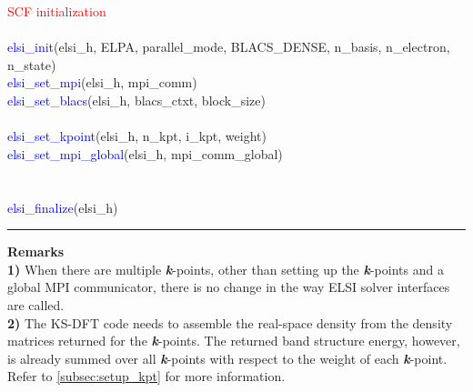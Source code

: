 \documentclass{report}
\begin{document}
\begin{algorithm}[H]
\textcolor{red}{SCF initialization}\\
\hspace{0.3cm}\\
\textcolor{blue}{elsi\_init}(elsi\_h, ELPA, parallel\_mode, BLACS\_DENSE, n\_basis, n\_electron, n\_state)\\
\textcolor{blue}{elsi\_set\_mpi}(elsi\_h, mpi\_comm)\\
\textcolor{blue}{elsi\_set\_blacs}(elsi\_h, blacs\_ctxt, block\_size)\\
\hspace{0.3cm}\\
\textcolor{blue}{elsi\_set\_kpoint}(elsi\_h, n\_kpt, i\_kpt, weight)\\
\textcolor{blue}{elsi\_set\_mpi\_global}(elsi\_h, mpi\_comm\_global)\\
\hspace{0.3cm}\\
\hspace{0.3cm}\\
\textcolor{blue}{elsi\_finalize}(elsi\_h)\\
\end{algorithm}

\bigskip
\noindent\rule{18cm}{0.4pt}

\newpage
\textbf{Remarks}\\

\textbf{1)} When there are multiple \textbf{\textit{k}}-points, other than setting up the \textbf{\textit{k}}-points and a global MPI communicator, there is no change in the way ELSI solver interfaces are called.\\

\textbf{2)} The KS-DFT code needs to assemble the real-space density from the density matrices returned for the \textbf{\textit{k}}-points.  The returned band structure energy, however, is already summed over all \textbf{\textit{k}}-points with respect to the weight of each \textbf{\textit{k}}-point.  Refer to \ref{subsec:setup_kpt} for more information.\\
\end{document}
